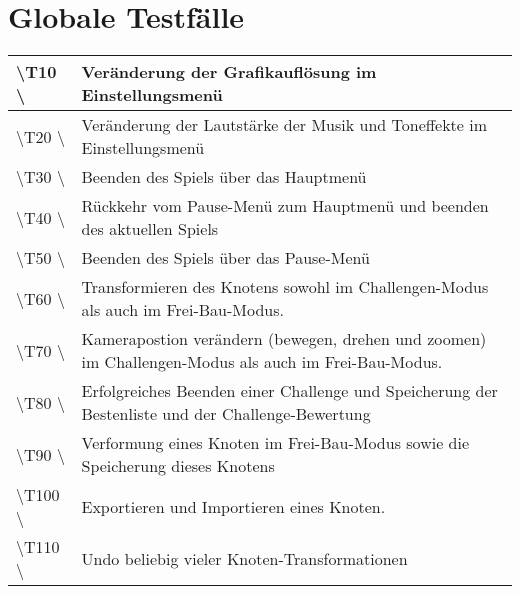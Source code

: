 \chapter{Globale Testfälle}

\begin{tabular}{|p{}|p{}|}
\hline 
\textbackslash T10  \textbackslash & Veränderung der Grafikauflösung  im Einstellungsmenü \\ 
\hline 
\textbackslash T20  \textbackslash & Veränderung der Lautstärke der Musik und Toneffekte im Einstellungsmenü  \\ 
\hline 
\textbackslash T30  \textbackslash & Beenden des Spiels über das Hauptmenü\\ 
\hline
\textbackslash T40  \textbackslash & Rückkehr vom Pause-Menü zum Hauptmenü und beenden des aktuellen Spiels \\ 
\hline
\textbackslash T50  \textbackslash & Beenden des Spiels über das Pause-Menü\\ 
\hline
\textbackslash T60  \textbackslash & Transformieren des Knotens sowohl im Challengen-Modus als auch im Frei-Bau-Modus.\\ 
\hline
\textbackslash T70  \textbackslash & Kamerapostion verändern (bewegen, drehen und zoomen) im Challengen-Modus als auch im Frei-Bau-Modus.\\ 
\hline
\textbackslash T80  \textbackslash & Erfolgreiches Beenden einer Challenge und Speicherung der Bestenliste und der Challenge-Bewertung\\ 
\hline
\textbackslash T90  \textbackslash & Verformung eines Knoten im Frei-Bau-Modus sowie die Speicherung dieses Knotens\\ 
\hline
\textbackslash T100  \textbackslash & Exportieren und Importieren eines Knoten.\\ 
\hline
\textbackslash T110  \textbackslash & Undo beliebig vieler Knoten-Transformationen\\ 
\hline
\end{tabular} 
